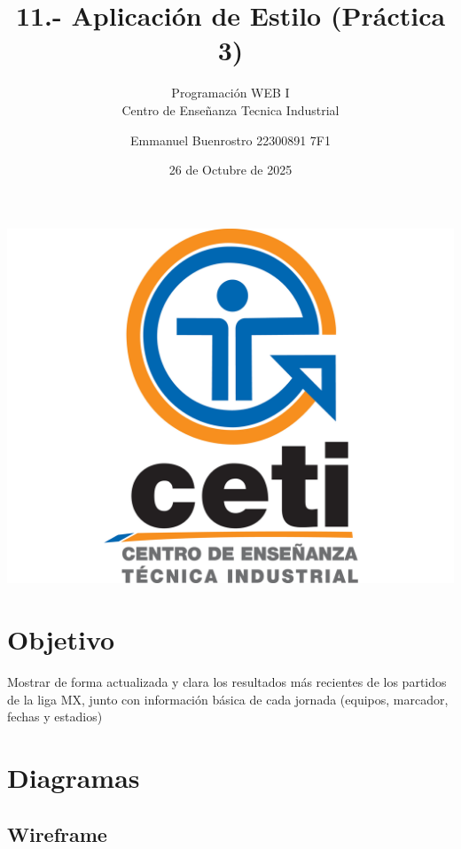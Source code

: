 \documentclass[11pt]{scrartcl}
\title {11.- Aplicación de Estilo (Práctica 3)}
\subtitle{Programación WEB I \\ Centro de Enseñanza Tecnica Industrial}
\date{26 de Octubre de 2025}
\author{Emmanuel Buenrostro 22300891 7F1}
\begin{document}
\maketitle


\begin{center}
   \includegraphics[scale=0.15]{../cetilogo.jpg} 
\end{center}
\newpage
\tableofcontents


\section{Objetivo}

Mostrar de forma actualizada y clara los resultados más recientes de los partidos de la liga MX, junto con información básica de cada jornada (equipos, marcador, fechas y estadios)
\section{Diagramas}

\subsection{Wireframe}
\end{document}
